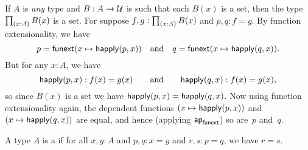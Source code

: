 \documentclass[hott-all.tex]{subfiles}
\begin{document}
\begin{eg}\label{thm:isset-forall}
  If $A$ is \emph{any} type and $B:A\to \mathcal{U}$ is such that each $B(x)$ is a set, then the type $\prd{x:A} B(x)$ is a set.
  For suppose $f,g:\prd{x:A} B(x)$ and $p,q:f=g$.
  By function extensionality, we have
  \begin{equation*}
    p = {\mathsf{funext} (x \mapsto \mathsf{happly}(p,x))}
    \quad\text{and}\quad
    q = {\mathsf{funext} (x \mapsto \mathsf{happly}(q,x))}.
  \end{equation*}
  But for any $x:A$, we have
  \begin{equation*}
   \mathsf{happly}(p,x):f(x)=g(x)
   \qquad\text{and}\qquad
   \mathsf{happly}(q,x):f(x)=g(x),
  \end{equation*}
  so since $B(x)$ is a set we have $\mathsf{happly}(p,x) = \mathsf{happly}(q,x)$.
  Now using function extensionality again, the dependent functions $(x \mapsto \mathsf{happly}(p,x))$ and $(x \mapsto \mathsf{happly}(q,x))$ are equal, and hence (applying $\mathsf{ap}_{\mathsf{funext}}$) so are~$p$ and~$q$.
\end{eg}
%
%
%

\begin{defn}\label{defn:1type}
  A type $A$ is a 
  if for all $x,y:A$ and $p,q:x=y$ and $r,s:p=q$, we have $r=s$.
\end{defn}
%
%
\end{document}
